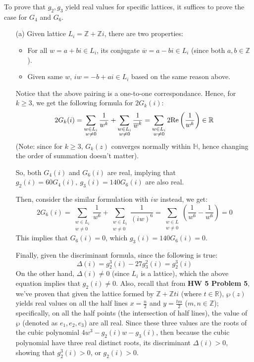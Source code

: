 \documentclass{article}
\begin{document}
To prove that $g_2,g_3$ yield real values for specific lattices, it suffices to prove the case for $G_4$ and $G_6$.
\begin{itemize}
    \item[(a)] Given lattice $L_i = \mathbb{Z}+\mathbb{Z}i$, there are two properties:
    \begin{itemize}
        \item For all $w=a+bi\in L_i$, its conjugate $\overline{w}=a-bi\in L_i$ (since both $a,b\in\mathbb{Z}$).
        \item Given same $w$, $iw = -b+ai \in L_i$ based on the same reason above.
    \end{itemize}
    Notice that the above pairing is a one-to-one correspondance. Hence, for $k\geq 3$, we get the following formula for $2G_k(i)$:
    $$2G_k(i) = \sum_{\substack{w\in L_i\\w\neq 0}}\frac{1}{w^k}+\sum_{\substack{w\in L_i\\w\neq 0}}\frac{1}{\overline{w}^k} = \sum_{\substack{w\in L_i\\w\neq 0}}2\textmd{Re}\left(\frac{1}{w^k}\right)\in \mathbb{R}$$
    (Note: since for $k\geq 3$, $G_k(z)$ converges normally within $\mathbb{H}$, hence changing the order of summation doesn't matter).

    So, both $G_4(i)$ and $G_6(i)$ are real, implying that $g_2(i)=60G_4(i),\ g_3(i)=140G_6(i)$ are also real.

    Then, consider the similar formulation with $iw$ instead, we get:
    $$2G_6(i) = \sum_{\substack{w\in L_i\\w\neq 0}}\frac{1}{w^6}+\sum_{\substack{w\in L_i\\w\neq 0}}\frac{1}{(iw)^6} = \sum_{\substack{w\in L\\w\neq 0}}\left(\frac{1}{w^6}-\frac{1}{w^6}\right) = 0$$
    This implies that $G_6(i) = 0$, which $g_3(i) = 140G_6(i)=0$.

    Finally, given the discriminant formula, since the following is true:
    $$\Delta(i)=g_2^3(i)-27g_3^2(i) = g_2^3(i)$$
    On the other hand, $\Delta(i)\neq 0$ (since $L_i$ is a lattice), which the above equation implies that $g_2(i)\neq 0$.
    Also, recall that from \textbf{HW 5 Problem 5}, we've proven that given the lattice formed by $\mathbb{Z}+\mathbb{Z}ti$ (where $t\in\mathbb{R}$), $\wp(z)$ yields real values on all the half lines $x=\frac{n}{2}$ and $y=\frac{tm}{2}$ ($m,n\in\mathbb{Z}$); specifically, on all the half points (the intersection of half lines), the value of $\wp$ (denoted as $e_1,e_2,e_3$) are all real. Since these three values are the roots of the cubic polynomial $4w^3-g_2(i)w-g_3(i)$, then because the cubic polynomial have three real distinct roots, its discriminant $\Delta(i) >0$, showing that $g_2^3(i)>0$, or $g_2(i)>0$.


\end{itemize}
\end{document}
